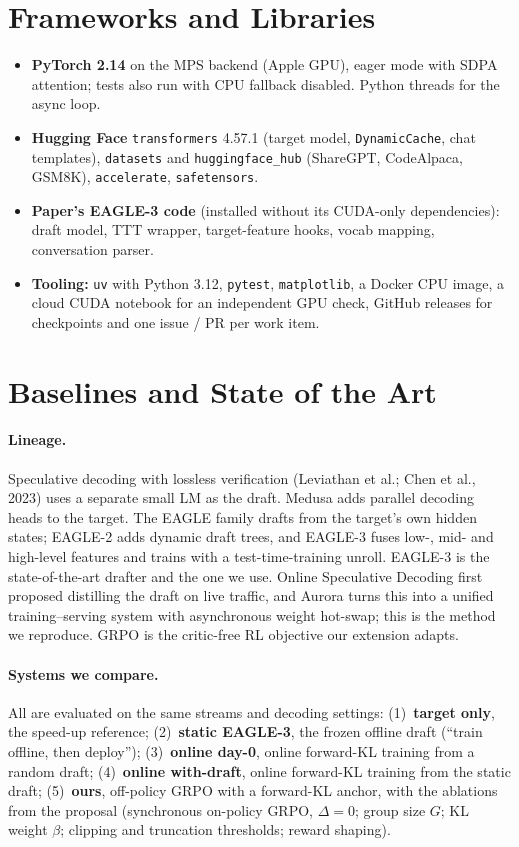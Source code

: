 \documentclass[11pt]{article}
\newcommand{\code}[1]{\texttt{\small #1}}
\begin{document}
\section{Frameworks and Libraries}

\begin{itemize}
  \item \textbf{PyTorch 2.14} on the MPS backend (Apple GPU), eager mode with SDPA attention; tests also run with
  CPU fallback disabled. Python threads for the async loop.
  \item \textbf{Hugging Face} \code{transformers} 4.57.1 (target model, \code{DynamicCache}, chat templates),
  \code{datasets} and \code{huggingface\_hub} (ShareGPT, CodeAlpaca, GSM8K), \code{accelerate}, \code{safetensors}.
  \item \textbf{Paper's EAGLE-3 code} (installed without its CUDA-only dependencies): draft model, TTT wrapper,
  target-feature hooks, vocab mapping, conversation parser.
  \item \textbf{Tooling:} \code{uv} with Python 3.12, \code{pytest}, \code{matplotlib}, a Docker CPU image, a cloud
  CUDA notebook for an independent GPU check, GitHub releases for checkpoints and one issue / PR per work item.
\end{itemize}

\section{Baselines and State of the Art}
\label{sec:baselines}

\paragraph{Lineage.} Speculative decoding with lossless verification (Leviathan et al.; Chen et al., 2023) uses a
separate small LM as the draft. Medusa adds parallel decoding heads to the target. The EAGLE family drafts from
the target's own hidden states; EAGLE-2 adds dynamic draft trees, and EAGLE-3 fuses low-, mid- and high-level
features and trains with a test-time-training unroll. EAGLE-3 is the state-of-the-art drafter and the one we use.
Online Speculative Decoding first proposed distilling the draft on live traffic, and Aurora turns this into a
unified training--serving system with asynchronous weight hot-swap; this is the method we reproduce. GRPO is the
critic-free RL objective our extension adapts.

\paragraph{Systems we compare.} All are evaluated on the same streams and decoding settings: (1)~\textbf{target
only}, the speed-up reference; (2)~\textbf{static EAGLE-3}, the frozen offline draft (``train offline, then
deploy''); (3)~\textbf{online day-0}, online forward-KL training from a random draft; (4)~\textbf{online
with-draft}, online forward-KL training from the static draft; (5)~\textbf{ours}, off-policy GRPO with a forward-KL
anchor, with the ablations from the proposal (synchronous on-policy GRPO, $\Delta=0$; group size $G$; KL weight
$\beta$; clipping and truncation thresholds; reward shaping).
\end{document}
